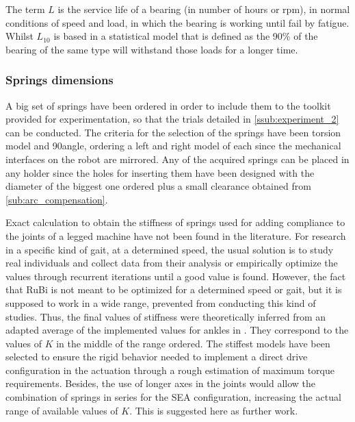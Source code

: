 The term $L$ is the service life of a bearing (in number of hours or rpm), in normal conditions of speed and load, in which the bearing is working until fail by fatigue. 
Whilst $L_{10}$ is based in a statistical model that is defined as the 90\% of the bearing of the same type will withstand those loads for a longer time.

\subsubsection{Springs dimensions} %
\label{ssub:springs_dimensions}
A big set of springs have been ordered in order to include them to the toolkit provided for experimentation, so that the trials detailed in \ref{ssub:experiment_2} can be conducted.
The criteria for the selection of the springs have been torsion model and 90\degree angle, ordering a left and right model of each since the mechanical interfaces on the robot are mirrored.
Any of the acquired springs can be placed in any holder since the holes for inserting them have been designed with the diameter of the biggest one ordered plus a small clearance obtained from \ref{sub:arc_compensation}.

Exact calculation to obtain the stiffness of springs used for adding compliance to the joints of a legged machine have not been found in the literature. 
For research in a specific kind of gait, at a determined speed, the usual solution is to study real individuals and collect data from their analysis or empirically optimize the values through recurrent iterations until a good value is found.
However, the fact that RuBi is not meant to be optimized for a determined speed or gait, but it is supposed to work in a wide range, prevented from conducting this kind of studies.
Thus, the final values of stiffness were theoretically inferred from an adapted average of the implemented values for ankles in \cite{grimmer}.
They correspond to the values of $K$ in the middle of the range ordered.
The stiffest models have been selected to ensure the rigid behavior needed to implement a direct drive configuration in the actuation through a rough estimation of maximum torque requirements.
Besides, the use of longer axes in the joints would allow the combination of springs in series for the SEA configuration, increasing the actual range of available values of $K$.
This is suggested here as further work.



